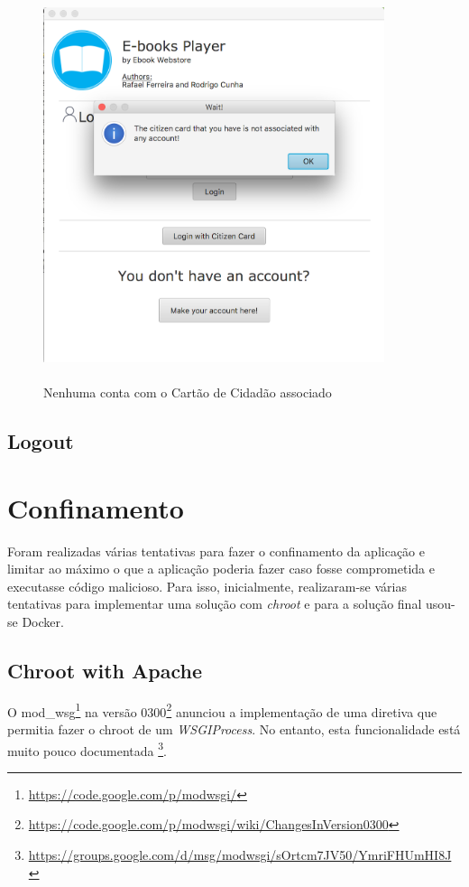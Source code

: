 \documentclass[pdftex,12pt,a4paper]{report}
\begin{document}
\begin{figure}[!htb]
\center
 \includegraphics[width=100mm,scale=1]{Noaccount.png}
 \caption{\\Nenhuma conta com o Cartão de Cidadão associado}
 \label{fig:noaccount}
\end{figure}

\newpage
\subsection{Logout}

\section{Confinamento}
Foram realizadas várias tentativas para fazer o confinamento da aplicação e limitar ao máximo o que a aplicação poderia fazer caso fosse comprometida e executasse código malicioso. Para isso, inicialmente, realizaram-se várias tentativas para implementar uma solução com \textit{chroot} e para a solução final usou-se Docker.

\subsection{Chroot with Apache}
O mod\_wsg\footnote{\label{url1} \url{https://code.google.com/p/modwsgi/}} na versão 0300\footnote{\label{url1} \url{https://code.google.com/p/modwsgi/wiki/ChangesInVersion0300}} anunciou a implementação de uma diretiva que permitia fazer o chroot de um \textit{WSGIProcess}. No entanto, esta funcionalidade está muito pouco documentada \footnote{\label{url1} \url{https://groups.google.com/d/msg/modwsgi/sOrtcm7JV50/YmriFHUmHI8J}}.
\end{document}
